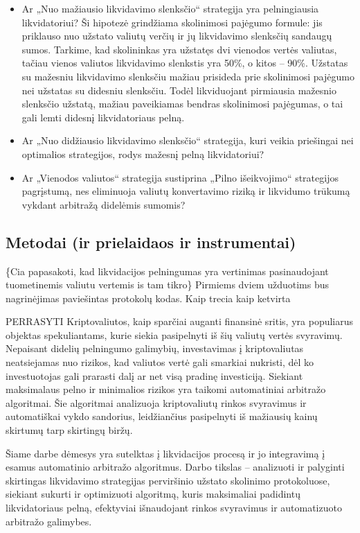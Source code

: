 \documentclass[]{VUMIFTemplateClass}
\begin{document}
\begin{enumerate}
  \begin{itemize}
    \item Ar „Nuo mažiausio likvidavimo slenksčio“ strategija yra pelningiausia likvidatoriui? Ši hipotezė grindžiama skolinimosi pajėgumo formule: jis priklauso nuo užstato valiutų verčių ir jų likvidavimo slenksčių sandaugų sumos. Tarkime, kad skolininkas yra užstatęs dvi vienodos vertės valiutas, tačiau vienos valiutos likvidavimo slenkstis yra 50\%, o kitos – 90\%. Užstatas su mažesniu likvidavimo slenksčiu mažiau prisideda prie skolinimosi pajėgumo nei užstatas su didesniu slenksčiu. Todėl likviduojant pirmiausia mažesnio slenksčio užstatą, mažiau paveikiamas bendras skolinimosi pajėgumas, o tai gali lemti didesnį likvidatoriaus pelną.
    \item Ar „Nuo didžiausio likvidavimo slenksčio“ strategija, kuri veikia priešingai nei optimalios strategijos, rodys mažesnį pelną likvidatoriui?
    \item Ar „Vienodos valiutos“ strategija sustiprina „Pilno išeikvojimo“ strategijos pagrįstumą, nes eliminuoja valiutų konvertavimo riziką ir likvidumo trūkumą vykdant arbitražą didelėmis sumomis?
  \end{itemize}
\end{enumerate}

\subsection{Metodai (ir prielaidaos ir instrumentai)}
\{Cia papasakoti, kad likvidacijos pelningumas yra vertinimas pasinaudojant tuometinemis valiutu vertemis is tam tikro\}
Pirmiems dviem užduotims bus nagrinėjimas paviešintas protokolų kodas.
Kaip trecia
kaip ketvirta


PERRASYTI
Kriptovaliutos, kaip sparčiai auganti finansinė sritis, yra populiarus objektas spekuliantams, kurie siekia pasipelnyti iš šių valiutų vertės svyravimų. Nepaisant didelių pelningumo galimybių, investavimas į kriptovaliutas neatsiejamas nuo rizikos, kad valiutos vertė gali smarkiai nukristi, dėl ko investuotojas gali prarasti dalį ar net visą pradinę investiciją. Siekiant maksimalaus pelno ir minimalios rizikos yra taikomi automatiniai arbitražo algoritmai. Šie algoritmai analizuoja kriptovaliutų rinkos svyravimus ir automatiškai vykdo sandorius, leidžiančius pasipelnyti iš mažiausių kainų skirtumų tarp skirtingų biržų.

Šiame darbe dėmesys yra sutelktas į likvidacijos procesą ir jo integravimą į esamus automatinio arbitražo algoritmus. Darbo tikslas – analizuoti ir palyginti skirtingas likvidavimo strategijas perviršinio užstato skolinimo protokoluose, siekiant sukurti ir optimizuoti algoritmą, kuris maksimaliai padidintų likvidatoriaus pelną, efektyviai išnaudojant rinkos svyravimus ir automatizuoto arbitražo galimybes.
\end{document}
